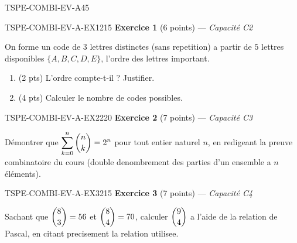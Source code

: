

\begin{evaluation}{TSPE-COMBI-EV-A}{45}

\begin{exercice}{TSPE-COMBI-EV-A-EX1}{2}{15}
\textbf{Exercice 1} (6 points) — \textit{Capacité C2}

\medskip

On forme un code de $3$ lettres distinctes (sans repetition) a partir de $5$ lettres disponibles $\{A,B,C,D,E\}$, l'ordre des lettres important.
\begin{enumerate}
  \item (2 pts) L'ordre compte-t-il ? Justifier.
  \item (4 pts) Calculer le nombre de codes possibles.
\end{enumerate}
\end{exercice}

\begin{exercice}{TSPE-COMBI-EV-A-EX2}{2}{20}
\textbf{Exercice 2} (7 points) — \textit{Capacité C3}

\medskip

Démontrer que $\displaystyle\sum_{k=0}^{n}\dbinom{n}{k} = 2^n$ pour tout entier naturel $n$, en redigeant la preuve combinatoire du cours (double denombrement des parties d'un ensemble a $n$ éléments).
\end{exercice}

\begin{exercice}{TSPE-COMBI-EV-A-EX3}{2}{15}
\textbf{Exercice 3} (7 points) — \textit{Capacité C4}

\medskip

Sachant que $\dbinom{8}{3}=56$ et $\dbinom{8}{4}=70$, calculer $\dbinom{9}{4}$ a l'aide de la relation de Pascal, en citant precisement la relation utilisee.
\end{exercice}

\end{evaluation}
